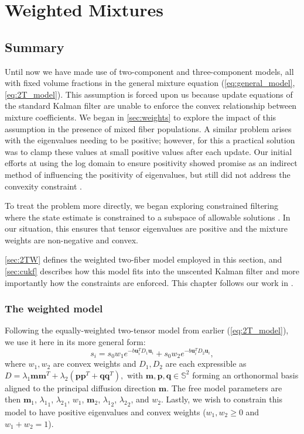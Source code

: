 \documentclass[final,hyperref]{gatech-thesis}
\renewcommand{\v}[1]{\ensuremath{\mathbf #1}\xspace}
\renewcommand{\S}{\ensuremath{\mathbb S}}
\renewcommand{\u}{\v u}
\newcommand{\m}{\v m}
\newcommand{\lx}{{\ensuremath{\lambda_1}} \xspace}
\newcommand{\ly}{{\ensuremath{\lambda_2}} \xspace}
\begin{document}
\chapter{Weighted Mixtures}  \label{ch:weighted}

\section{Summary}

Until now we have made use of two-component and three-component models, all
with fixed volume fractions in the general mixture equation
(\autoref{eq:general_model},\autoref{eq:2T_model}).
%
This assumption is forced upon us because update equations of the standard
Kalman filter are unable to enforce the convex relationship between mixture
coefficients.  We began in \autoref{sec:weights} to explore the impact of this
assumption in the presence of mixed fiber populations.  A similar problem
arises with the eigenvalues needing to be positive; however, for this a
practical solution was to clamp these values at small positive values after
each update.
%
Our initial efforts at using the log domain to ensure positivity showed
promise as an indirect method of influencing the positivity of eigenvalues,
but still did not address the convexity constraint \cite{rathi2010mrm}.

To treat the problem more directly, we began exploring constrained filtering
where the state estimate is constrained to a subspace of allowable solutions
\cite{Simon2006}.  In our situation, this ensures that tensor eigenvalues are
positive and the mixture weights are non-negative and convex.

\autoref{sec:2TW} defines the weighted two-fiber model employed in
this section, and \autoref{sec:cukf} describes how this
model fits into the unscented Kalman filter and more importantly how the
constraints are enforced.  This chapter follows our work in
\cite{malcolm2009cukf,Malcolm2009cukf_ext}.


\subsection{The weighted model} \label{sec:2TW}

Following the equally-weighted two-tensor model from earlier
(\autoref{eq:2T_model}), we use it here in its more general form:
\begin{equation} \label{eq:2TW_model}
  s_i = s_0 w_1 e^{ -b \u_i^T D_1 \u_i } + s_0 w_2 e^{ -b \u_i^T D_2 \u_i } ,
\end{equation}
where $w_1,w_2$ are convex weights and $D_1,D_2$ are each expressible as
%
$ D = \lx \m \m^T + \ly\left(\v{p}\v{p}^T + \v{q}\v{q}^T\right), $
%
with $\m,\v{p},\v{q} \in \S^2$ forming an orthonormal basis aligned to the
principal diffusion direction \m.  The free model parameters are then $\m_1$,
$\lx_1$, $\ly_1$, $w_1$, $\m_2$, $\lx_2$, $\ly_2$, and $w_2$.  Lastly, we wish
to constrain this model to have positive eigenvalues and convex weights
($w_1,w_2\ge0$ and $w_1+w_2=1$).
\end{document}
